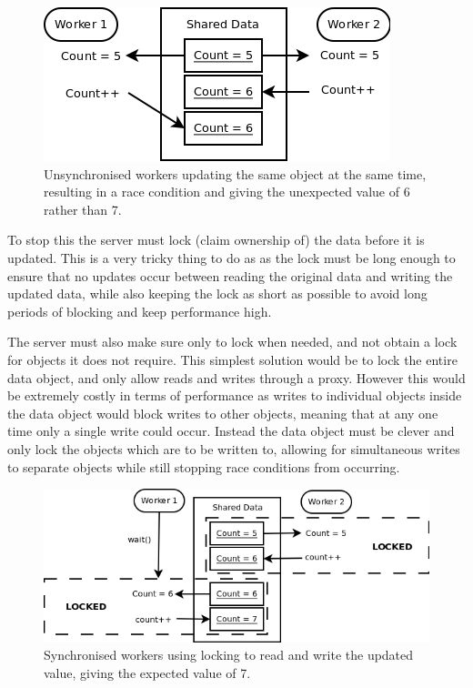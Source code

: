 \begin{figure}
    \begin{center}
        \includegraphics[scale=0.6]{Design/diagrams/server_race_condition.png}
        \caption{Unsynchronised workers updating the same object at the same time, resulting in a race condition and giving the unexpected value of 6 rather than 7.}
        \label{RaceConditionDia}
    \end{center}
\end{figure}

To stop this the server must lock (claim ownership of) the data before it is updated. This is a very tricky thing to do as as the lock must be long enough to ensure that no updates occur between reading the original data and writing the updated data, while also keeping the lock as short as possible to avoid long periods of blocking and keep performance high.

The server must also make sure only to lock when needed, and not obtain a lock for objects it does not require. This simplest solution would be to lock the entire data object, and only allow reads and writes through a proxy. However this would be extremely costly in terms of performance as writes to individual objects inside the data object would block writes to other objects, meaning that at any one time only a single write could occur. Instead the data object must be clever and only lock the objects which are to be written to, allowing for simultaneous writes to separate objects while still stopping race conditions from occurring.

\begin{figure}
    \begin{center}
        \includegraphics[scale=0.6]{Design/diagrams/server_locking.png}
        \caption{Synchronised workers using locking to read and write the updated value, giving the expected value of 7.}
        \label{lockingDia}
    \end{center}
\end{figure}

